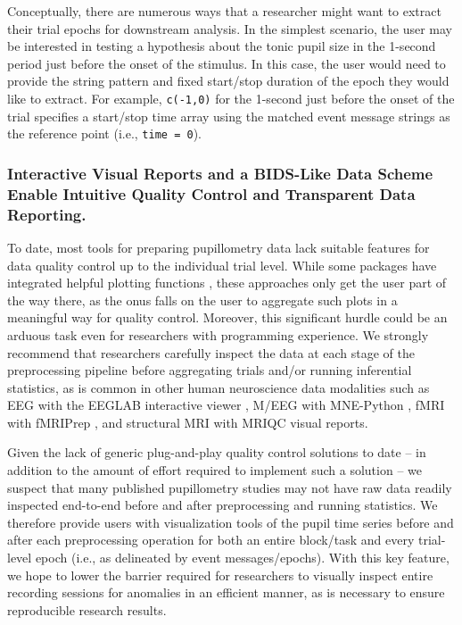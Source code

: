 Conceptually, there are numerous ways that a researcher might want to extract their trial epochs for downstream analysis. In the simplest scenario, the user may be interested in testing a hypothesis about the tonic pupil size in the 1-second period just before the onset of the stimulus. In this case, the user would need to provide the string pattern and fixed start/stop duration of the epoch they would like to extract. For example, \texttt{c(-1,0)} for the 1-second just before the onset of the trial specifies a start/stop time array using the matched event message strings as the reference point (i.e., \texttt{time = 0}).

\subsubsection{Interactive Visual Reports and a BIDS-Like Data Scheme Enable Intuitive Quality Control and Transparent Data Reporting.}\label{sec:visual-reports}
To date, most tools for preparing pupillometry data lack suitable features for data quality control up to the individual trial level. While some packages have integrated helpful plotting functions \parencite[e.g.,][]{forbes2020pupillometryr,hershman2019chap,mittner2020pypillometry,tsukahara2020pupillometry}, these approaches only get the user part of the way there, as the onus falls on the user to aggregate such plots in a meaningful way for quality control. Moreover, this significant hurdle could be an arduous task even for researchers with programming experience. We strongly recommend that researchers carefully inspect the data at each stage of the preprocessing pipeline before aggregating trials and/or running inferential statistics, as is common in other human neuroscience data modalities such as EEG with the EEGLAB interactive viewer \parencite{delorme2004eeglab}, M/EEG with MNE-Python \parencite{gramfort2013meg}, fMRI with fMRIPrep \parencite{esteban2019fmriprep}, and structural MRI with MRIQC \parencite{esteban2017mriqc,provins2023quality} visual reports.

Given the lack of generic plug-and-play quality control solutions to date – in addition to the amount of effort required to implement such a solution – we suspect that many published pupillometry studies may not have raw data readily inspected end-to-end before and after preprocessing and running statistics. We therefore provide users with visualization tools of the pupil time series before and after each preprocessing operation for both an entire block/task and every trial-level epoch (i.e., as delineated by event messages/epochs). With this key feature, we hope to lower the barrier required for researchers to visually inspect entire recording sessions for anomalies in an efficient manner, as is necessary to ensure reproducible research results.

